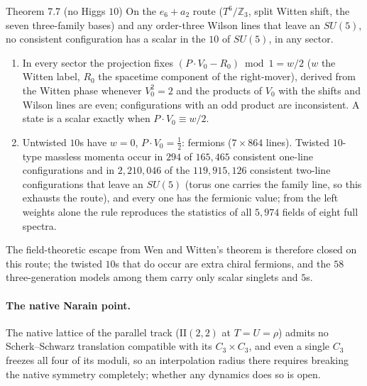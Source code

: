 \begin{result}{Theorem 7.7 (no Higgs $10$) \hfill \tierC}
On the $e_6+a_2$ route ($T^6/\mathbb Z_3$, split Witten shift, the seven three-family bases) and any order-three Wilson lines that leave an
$SU(5)$, no consistent configuration has a scalar in the $10$ of $SU(5)$, in any sector.
\begin{enumerate}[label=(\roman*),leftmargin=1.5em]
\item In every sector the projection fixes $(P\cdot V_0-R_0)\bmod1=w/2$ ($w$ the Witten label, $R_0$ the spacetime component of the
      right-mover), derived from the Witten phase whenever $V_0^2=2$ and the products of $V_0$ with the shifts and Wilson lines are even;
      configurations with an odd product are inconsistent. A state is a scalar exactly when $P\cdot V_0\equiv w/2$.
\item Untwisted $10$s have $w=0$, $P\cdot V_0=\tfrac12$: fermions ($7\times864$ lines). Twisted $10$-type massless momenta occur in
      $294$ of $165{,}465$ consistent one-line configurations and in $2{,}210{,}046$ of the $119{,}915{,}126$ consistent two-line
      configurations that leave an $SU(5)$ (torus one carries the family line, so this exhausts the route), and every one has the
      fermionic value; from the left weights alone the rule reproduces the statistics of all $5{,}974$ fields of eight full spectra.
\end{enumerate}
The field-theoretic escape from Wen and Witten's theorem is therefore closed on this route; the twisted $10$s that do occur are extra
chiral fermions, and the $58$ three-generation models among them carry only scalar singlets and $5$s.     
\end{result}

\paragraph{The native Narain point.} The native lattice of the parallel track (II$(2,2)$ at $T=U=\rho$) admits no Scherk--Schwarz
translation compatible with its $C_3\times C_3$, and even a single $C_3$ freezes all four of its moduli, so an interpolation radius
there requires breaking the native symmetry completely; whether any dynamics does so is open.  

